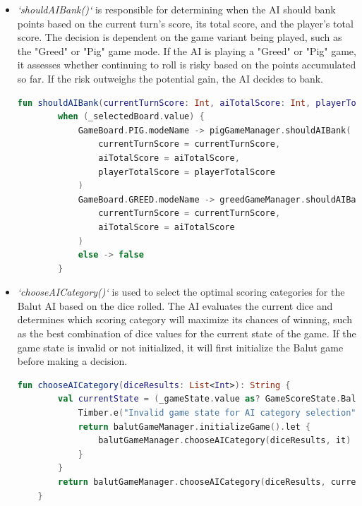 \begin{itemize}
\item  \textit{`shouldAIBank()`} is responsible for determining when the AI should bank points based on the current turn’s score, its total score, and the player's total score. The decision is dependent on the game variant being played, such as the "Greed" or "Pig" game mode. If the AI is playing a "Greed" or "Pig" game, it assesses whether continuing to roll is risky based on the points accumulated so far. If the risk outweighs the potential gain, the AI decides to bank.
       
\begin{lstlisting}[language=Kotlin,caption={Should AI Bank Function.}, label={lst:shouldAIBank}]
    fun shouldAIBank(currentTurnScore: Int, aiTotalScore: Int, playerTotalScore: Int): Boolean =
        when (_selectedBoard.value) {
            GameBoard.PIG.modeName -> pigGameManager.shouldAIBank(
                currentTurnScore = currentTurnScore,
                aiTotalScore = aiTotalScore,
                playerTotalScore = playerTotalScore
            )
            GameBoard.GREED.modeName -> greedGameManager.shouldAIBank(
                currentTurnScore = currentTurnScore,
                aiTotalScore = aiTotalScore
            )
            else -> false
        }
\end{lstlisting}
    
\item \textit{`chooseAICategory()`} is used to select the optimal scoring categories for the Balut AI based on the dice rolled. The AI evaluates the current dice and determines which scoring category will maximize its chances of winning, such as the best combination of dice values for the current state of the game. If the game state is invalid or not initialized, it will first initialize the Balut game before making a decision.
       
\begin{lstlisting}[language=Kotlin,caption={Choose AI Category Function.}, label={lst:chooseAICategory}]
    fun chooseAICategory(diceResults: List<Int>): String {
        val currentState = (_gameState.value as? GameScoreState.BalutScoreState) ?: run {
            Timber.e("Invalid game state for AI category selection")
            return balutGameManager.initializeGame().let {
                balutGameManager.chooseAICategory(diceResults, it)
            }
        }
        return balutGameManager.chooseAICategory(diceResults, currentState)
    }
    \end{lstlisting}
    
\end{itemize}
    
